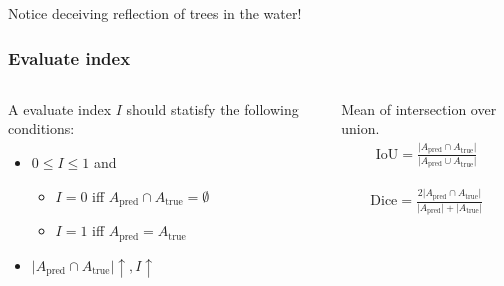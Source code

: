 \documentclass[12pt, aspectratio = 169, xcolor = x11names]{beamer}
\begin{document}
\begin{frame}
  \pause%
  \alert{Notice deceiving reflection of trees in the water!}
\end{frame}

\begin{frame}
  \frametitle{Evaluate index}
  \begin{columns}
    \begin{column}{0.5\textwidth}
      A evaluate index $I$ should statisfy the following conditions:
      \pause%
      \begin{itemize}[<+->]
        \item$0 \leqslant I \leqslant 1$ and
          \begin{itemize}
            \item$I = 0$ iff $A_\mathrm{pred} \cap A_\mathrm{true} = \emptyset$
            \item$I = 1$ iff $A_\mathrm{pred} = A_\mathrm{true}$
          \end{itemize}
        \item$\lvert A_\mathrm{pred} \cap A_\mathrm{true}\rvert \uparrow, I \uparrow$
      \end{itemize}
    \end{column}
    \pause%
    \begin{column}{0.5\textwidth}
      \begin{definition}[mIoU]
        Mean of intersection over union.
        \begin{align*}
          \mathrm{IoU} = \frac{\lvert A_\mathrm{pred} \cap A_\mathrm{true}\rvert}{\lvert A_\mathrm{pred} \cup A_\mathrm{true}\rvert}
        \end{align*}
      \end{definition}
      \pause%
      \begin{definition}
        \begin{align*}
          \mathrm{Dice} = \frac{2\lvert A_\mathrm{pred} \cap A_\mathrm{true}\rvert}{\lvert A_\mathrm{pred}\rvert + \lvert A_\mathrm{true}\rvert}
        \end{align*}
      \end{definition}
    \end{column}
  \end{columns}
\end{frame}
\end{document}
